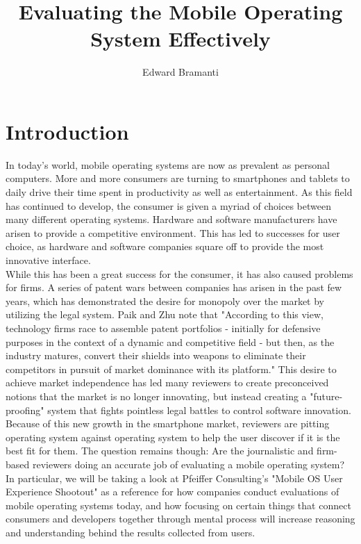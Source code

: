 \documentclass[11pt]{article}
\title{Evaluating the Mobile Operating System Effectively}
\author{Edward Bramanti}
\begin{document}
\maketitle
\begin{abstract}
\end{abstract}
\pagebreak
\section{Introduction}
In today's world, mobile operating systems are now as prevalent as personal computers. More and more consumers are turning to smartphones and tablets to daily drive their time spent in productivity as well as entertainment. As this field has continued to develop, the consumer is given a myriad of choices between many different operating systems. Hardware and software manufacturers have arisen to provide a competitive environment. This has led to successes for user choice, as hardware and software companies square off to provide the most innovative interface.\\
\indent While this has been a great success for the consumer, it has also caused problems for firms. A series of patent wars between companies has arisen in the past few years, which has demonstrated the desire for monopoly over the market by utilizing the legal system. Paik and Zhu note that "According to this view, technology firms race to assemble patent portfolios - initially for defensive purposes in the context of a dynamic and competitive field - but then, as the industry matures, convert their shields into weapons to eliminate their competitors in pursuit of market dominance with its platform."\cite{PatentWars} This desire to achieve market independence has led many reviewers to create preconceived notions that the market is no longer innovating, but instead creating a "future-proofing" system that fights pointless legal battles to control software innovation.\\
\indent Because of this new growth in the smartphone market, reviewers are pitting operating system against operating system to help the user discover if it is the best fit for them. The question remains though: Are the journalistic and firm-based reviewers doing an accurate job of evaluating a mobile operating system? In particular, we will be taking a look at Pfeiffer Consulting's "Mobile OS User Experience Shootout" as a reference for how companies conduct evaluations of mobile operating systems today, and how focusing on certain things that connect consumers and developers together through mental process will increase reasoning and understanding behind the results collected from users.
\end{document}
